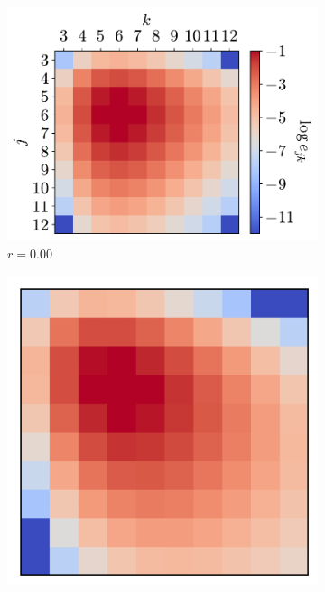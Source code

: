 \begin{figure}[bt]
     \vspace{0.2cm}
        \begin{subfigure}[b]{0.32\textwidth}
         \centering
         \includegraphics[width=\textwidth]{./figures/general_networks/assort_mat_0.pdf}
         \caption{$r=0.00$}
         \label{fig:rexe}
     \end{subfigure}
     \hfill
     \begin{subfigure}[b]{0.205\textwidth}
         \centering
         \includegraphics[width=\textwidth]{./figures/general_networks/assort_mat_25.pdf}

\end{subfigure}
\end{figure}
